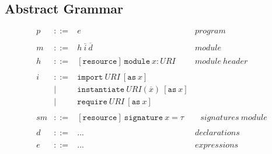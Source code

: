 \documentclass{llncs}
\newcommand{\keywadj}[1]{\mathtt{#1}}
\newcommand{\keyw}[1]{\keywadj{#1}~}
\begin{document}
\newpage

\subsection{Abstract Grammar}
\[
\begin{array}{cllr}
p & ::= & e & program \\
&&\\
m & ::= & h~\overline{i}~\overline{d} & module \\
&&\\
h & ::= & [\keywadj{resource}]~\keyw{module} x : URI & module~header \\
&&\\
i & ::= & \keyw{import} URI~[\keyw{as} x] \\
  & |   & \keyw{instantiate} URI(\overline{x})~[\keyw{as} x] \\
  & |   & \keyw{require} URI~[\keyw{as} x]\\
&&\\
sm & ::= & [\keywadj{resource}]~\keyw{signature} x = \tau &~~~signatures~module \\
&&\\
d & ::= & ... & declarations \\
&&\\
e & ::= & ... & expressions \\
&&\\
\end{array}
\]
\end{document}
